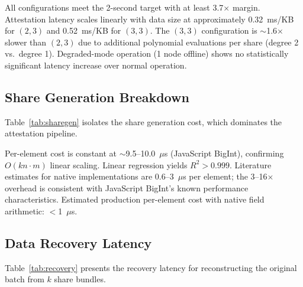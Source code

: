 All configurations meet the 2-second target with at least 3.7$\times$ margin.
Attestation latency scales linearly with data size at approximately
0.32~ms/KB for $(2,3)$ and 0.52~ms/KB for $(3,3)$. The $(3,3)$ configuration
is $\sim$1.6$\times$ slower than $(2,3)$ due to additional polynomial
evaluations per share (degree 2 vs.\ degree 1). Degraded-mode operation (1
node offline) shows no statistically significant latency increase over
normal operation.

\subsection{Share Generation Breakdown}

Table~\ref{tab:sharegen} isolates the share generation cost, which dominates
the attestation pipeline.

\begin{table}[htbp]
\centering
\caption{Share Generation Latency (2-of-3 Configuration)}
\label{tab:sharegen}
\end{table}

Per-element cost is constant at $\sim$9.5--10.0~$\mu$s (JavaScript BigInt),
confirming $O(kn \cdot m)$ linear scaling. Linear regression yields
$R^2 > 0.999$. Literature estimates for native implementations are
0.6--3~$\mu$s per element; the 3--16$\times$ overhead is consistent with
JavaScript BigInt's known performance characteristics. Estimated production
per-element cost with native field arithmetic: $<$1~$\mu$s.

\subsection{Data Recovery Latency}

Table~\ref{tab:recovery} presents the recovery latency for reconstructing
the original batch from $k$ share bundles.

